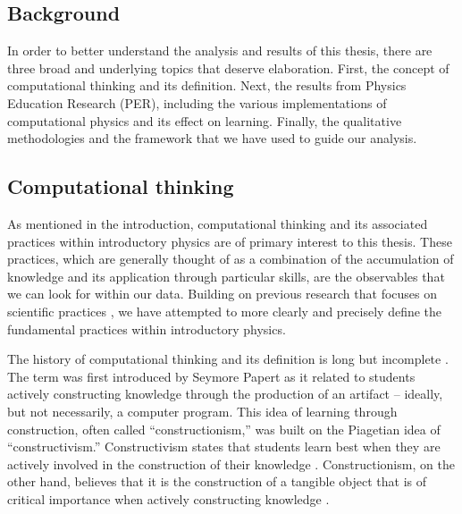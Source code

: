 \documentclass{msuphddissertation}
\begin{document}
\begin{doublespace}
%
%
%
%
%
%
%
%
%
%
%
%
%
%
%
%

\chapter{Background}\label{CH2:Background}

In order to better understand the analysis and results of this thesis, there are three broad and underlying topics that deserve elaboration.  First, the concept of computational thinking and its definition.  Next, the results from Physics Education Research (PER), including the various implementations of computational physics and its effect on learning.  Finally, the qualitative methodologies and the framework that we have used to guide our analysis.

\section{Computational thinking}

As mentioned in the introduction, computational thinking and its associated practices within introductory physics are of primary interest to this thesis.  These practices, which are generally thought of as a combination of the accumulation of knowledge and its application through particular skills, are the observables that we can look for within our data.  Building on previous research that focuses on scientific practices \cite{AAPT2016,NGSS2012,Weintrop2015}, we have attempted to more clearly and precisely define the fundamental practices within introductory physics.

The history of computational thinking and its definition is long but incomplete \cite{Papert1981,Papert1996,Wing2006,Wing2008,Aho2012,Grover2013,Bundy2007}.  The term was first introduced by Seymore Papert as it related to students actively constructing knowledge through the production of an artifact -- ideally, but not necessarily, a computer program.  This idea of learning through construction, often called ``constructionism,'' was built on the Piagetian idea of ``constructivism.''  Constructivism states that students learn best when they are actively involved in the construction of their knowledge \cite{Piaget1963}.  Constructionism, on the other hand, believes that it is the construction of a tangible object that is of critical importance when actively constructing knowledge \cite{Papert1981}.


\end{doublespace}
\end{document}
